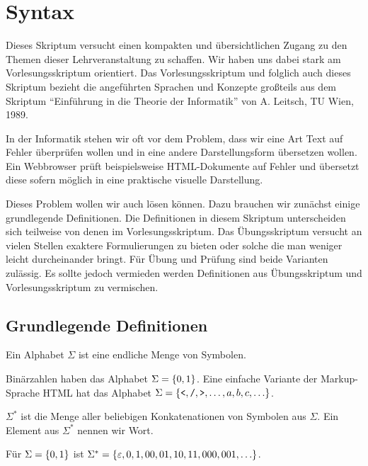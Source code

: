 \chapter{Syntax}
Dieses Skriptum versucht einen kompakten und übersichtlichen Zugang zu den Themen
dieser Lehrveranstaltung zu schaffen.
Wir haben uns dabei stark am Vorlesungsskriptum orientiert.
Das Vorlesungsskriptum und folglich auch dieses Skriptum bezieht die angeführten
Sprachen und Konzepte großteils aus dem Skriptum ``Einführung in die Theorie der Informatik'' von A. Leitsch, TU Wien, 1989.

In der Informatik stehen wir oft vor dem Problem, dass wir eine Art Text auf
Fehler überprüfen wollen und in eine andere Darstellungsform übersetzen wollen.
Ein Webbrowser prüft beispielsweise HTML-Dokumente auf Fehler und übersetzt diese
sofern möglich in eine praktische visuelle Darstellung.

Dieses Problem wollen wir auch lösen können. Dazu brauchen wir zunächst einige grundlegende Definitionen.
Die Definitionen in diesem Skriptum unterscheiden sich teilweise von denen im Vorlesungsskriptum.
Das Übungsskriptum versucht an vielen Stellen exaktere Formulierungen zu bieten
oder solche die man weniger leicht durcheinander bringt.
Für Übung und Prüfung sind beide Varianten zulässig. Es sollte jedoch vermieden
werden Definitionen aus Übungsskriptum und Vorlesungsskriptum zu vermischen.

\section{Grundlegende Definitionen}
\begin{defn}[Alphabet]
Ein Alphabet $\Sigma$ ist eine endliche Menge von Symbolen.
\end{defn}

Binärzahlen haben das Alphabet $\Sigma=\left\{0,1\right\}$.
Eine einfache Variante der Markup-Sprache HTML hat das Alphabet $\Sigma=\left\{\texttt{<},\texttt{/},\texttt{>},\ldots,a,b,c,\ldots\right\}$.

\begin{defn}
$\Sigma^*$ ist die Menge aller beliebigen Konkatenationen von Symbolen aus $\Sigma$.
Ein Element aus $\Sigma^*$ nennen wir Wort.
\end{defn}

Für $\Sigma=\left\{0,1\right\}$ ist $\Sigma^*=\left\{\varepsilon,0,1,00,01,10,11,000,001,\ldots\right\}$.

